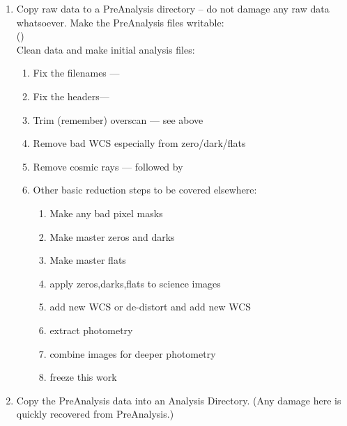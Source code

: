\vspace{-.15cm}
\begin{enumerate}[resume]\addtolength{\itemsep}{-0.5\baselineskip}
   \item   Copy raw data to a PreAnalysis directory -- do not damage any
raw data whatsoever. Make the PreAnalysis files writable:\\
({\color{verbcolor}{\verb#cd Observations/YYYYmmDD; mkdir -p PreAnalysis; cd PreAnalysis; cp -pr ../RawData/* .; chmod +w -R .#}})\\
Clean data and make initial analysis files:
\vspace{-.15cm}
\begin{enumerate}\addtolength{\itemsep}{-0.5\baselineskip}
   \item   Fix the filenames --- {\color{verbcolor}{\verb#cl < ~sbo/iraf/fix_sbig.cl#}}
   \item   Fix the headers--- {\color{verbcolor}{\verb#cl < ~sbo/iraf/fix_headers.cl#}}
   \item   Trim (remember) overscan --- see above
   \item   Remove bad WCS especially from zero/dark/flats {\color{verbcolor}{\verb#cl < ~sbo/iraf/fix_sbig_wcs.cl#}}
   \item   Remove cosmic rays ---  {\color{verbcolor}{\verb#!ls -1 *fits > l.l#}}
followed by {\color{verbcolor}{\verb#cl < ~sbo/iraf/crall.cl#}}
\item Other basic reduction steps to be covered elsewhere:
\begin{enumerate}\addtolength{\itemsep}{-0.5\baselineskip}
   \item   Make any bad pixel masks 
   \item   Make master zeros and darks 
   \item   Make master flats 
   \item   apply zeros,darks,flats to science images
   \item   add new WCS or de-distort and add new WCS
   \item   extract photometry
   \item   combine images for deeper photometry
   \item   freeze this work
\end{enumerate}
\end{enumerate}


   \item  Copy the PreAnalysis data into an Analysis Directory.
(Any damage here is quickly recovered from PreAnalysis.)\\
{\color{verbcolor}{\verb#!(cd ..; mkdir -p Analysis; cd Analysis; cp -pr ../PreAnalysis/f_d_z_c_t* .)#}}
\end{enumerate}



